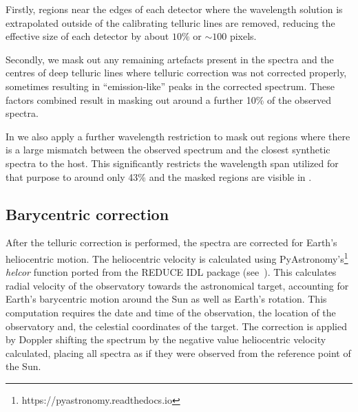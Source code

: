 Firstly, regions near the edges of each detector where the wavelength solution is extrapolated outside of the calibrating telluric lines are removed, reducing the effective size of each detector by about \(10\%\) or \(\sim100\) pixels.

Secondly, we mask out any remaining artefacts present in the spectra and the centres of deep telluric lines where telluric correction was not corrected properly, sometimes resulting in ``emission-like'' peaks in the corrected spectrum. These factors combined result in masking out around a further 10\% of the observed spectra.

In  we also apply a further wavelength restriction to mask out regions where there is a large mismatch between the observed spectrum and the closest synthetic spectra to the host. This significantly restricts the wavelength span utilized for that purpose to around only 43\% and the masked regions are visible in .




\subsection{Barycentric correction}
After the telluric correction is performed, the spectra are corrected for Earth's heliocentric motion. The heliocentric velocity is calculated using PyAstronomy's\footnote{https://pyastronomy.readthedocs.io} \emph{helcor} function ported from the REDUCE IDL package (see~\citet[][]{piskunov_new_2002}). This calculates radial velocity of the observatory towards the astronomical target, accounting for Earth's barycentric motion around the Sun as well as Earth's rotation. This computation requires the date and time of the observation, the location of the observatory and, the celestial coordinates of the target.
The correction is applied by Doppler shifting the spectrum by the negative value heliocentric velocity calculated, placing all spectra as if they were observed from the reference point of the Sun.
